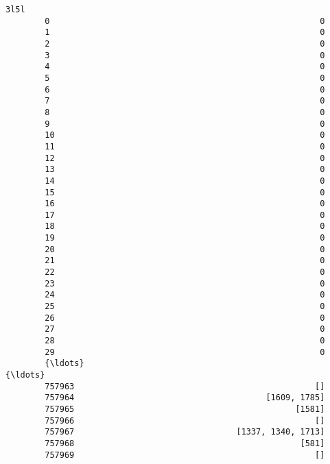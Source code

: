 \documentclass[11pt]{article}
\begin{document}
\begin{Verbatim}[commandchars=\\\{\}]
                                                             3l5l  
        0                                                       0  
        1                                                       0  
        2                                                       0  
        3                                                       0  
        4                                                       0  
        5                                                       0  
        6                                                       0  
        7                                                       0  
        8                                                       0  
        9                                                       0  
        10                                                      0  
        11                                                      0  
        12                                                      0  
        13                                                      0  
        14                                                      0  
        15                                                      0  
        16                                                      0  
        17                                                      0  
        18                                                      0  
        19                                                      0  
        20                                                      0  
        21                                                      0  
        22                                                      0  
        23                                                      0  
        24                                                      0  
        25                                                      0  
        26                                                      0  
        27                                                      0  
        28                                                      0  
        29                                                      0  
        {\ldots}                                                   {\ldots}  
        757963                                                 []  
        757964                                       [1609, 1785]  
        757965                                             [1581]  
        757966                                                 []  
        757967                                 [1337, 1340, 1713]  
        757968                                              [581]  
        757969                                                 []  

\end{Verbatim}
\end{document}
